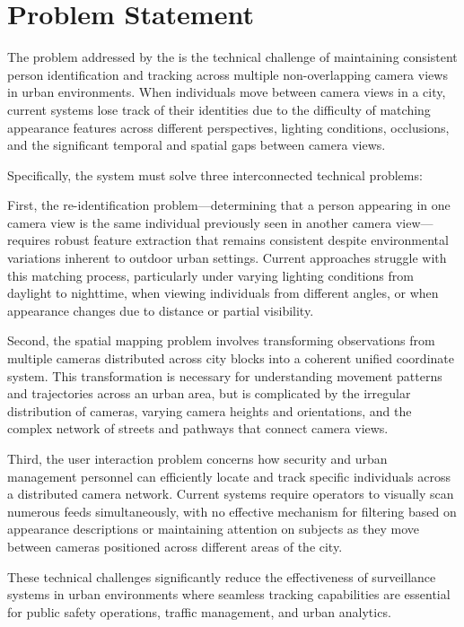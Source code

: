 \section{Problem Statement}
\label{section:problem-statement}

The problem addressed by the \usevar{\srsTitle} is the technical challenge of maintaining consistent person identification and tracking across multiple non-overlapping camera views in urban environments. When individuals move between camera views in a city, current systems lose track of their identities due to the difficulty of matching appearance features across different perspectives, lighting conditions, occlusions, and the significant temporal and spatial gaps between camera views.

Specifically, the system must solve three interconnected technical problems:

First, the re-identification problem—determining that a person appearing in one camera view is the same individual previously seen in another camera view—requires robust feature extraction that remains consistent despite environmental variations inherent to outdoor urban settings. Current approaches struggle with this matching process, particularly under varying lighting conditions from daylight to nighttime, when viewing individuals from different angles, or when appearance changes due to distance or partial visibility.

Second, the spatial mapping problem involves transforming observations from multiple cameras distributed across city blocks into a coherent unified coordinate system. This transformation is necessary for understanding movement patterns and trajectories across an urban area, but is complicated by the irregular distribution of cameras, varying camera heights and orientations, and the complex network of streets and pathways that connect camera views.

Third, the user interaction problem concerns how security and urban management personnel can efficiently locate and track specific individuals across a distributed camera network. Current systems require operators to visually scan numerous feeds simultaneously, with no effective mechanism for filtering based on appearance descriptions or maintaining attention on subjects as they move between cameras positioned across different areas of the city.

These technical challenges significantly reduce the effectiveness of surveillance systems in urban environments where seamless tracking capabilities are essential for public safety operations, traffic management, and urban analytics.

